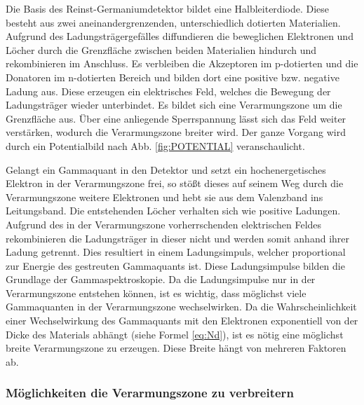 Die Basis des Reinst-Germaniumdetektor bildet eine Halbleiterdiode. Diese besteht aus zwei aneinandergrenzenden, unterschiedlich dotierten Materialien. Aufgrund des Ladungsträgergefälles diffundieren die beweglichen Elektronen und Löcher durch die Grenzfläche zwischen beiden Materialien hindurch und rekombinieren im Anschluss. Es verbleiben die Akzeptoren im p-dotierten und die Donatoren im n-dotierten Bereich und bilden dort eine positive bzw. negative Ladung aus. Diese erzeugen ein elektrisches Feld, welches die Bewegung der Ladungsträger wieder unterbindet. Es bildet sich eine Verarmungszone um die Grenzfläche aus. Über eine anliegende Sperrspannung lässt sich das Feld weiter verstärken, wodurch die Verarmungszone breiter wird.
Der ganze Vorgang wird durch ein Potentialbild nach Abb. \ref{fig:POTENTIAL} veranschaulicht.

Gelangt ein Gammaquant in den Detektor und setzt ein hochenergetisches Elektron in der Verarmungszone frei, so stößt dieses auf seinem Weg durch die Verarmungszone weitere Elektronen und hebt sie aus dem Valenzband ins Leitungsband. Die entstehenden Löcher verhalten sich wie positive Ladungen. Aufgrund des in der Verarmungszone vorherrschenden elektrischen Feldes rekombinieren die Ladungsträger in dieser nicht und werden somit anhand ihrer Ladung getrennt. Dies resultiert in einem Ladungsimpuls, welcher proportional zur Energie des gestreuten Gammaquants ist. Diese Ladungsimpulse bilden die Grundlage der Gammaspektroskopie. Da die Ladungsimpulse nur in der Verarmungszone entstehen können, ist es wichtig, dass möglichst viele Gammaquanten in der Verarmungszone wechselwirken.
Da die Wahrscheinlichkeit einer Wechselwirkung des Gammaquants mit den Elektronen exponentiell von der Dicke des Materials abhängt (siehe Formel \eqref{eq:Nd}), ist es nötig eine möglichst breite Verarmungszone zu erzeugen. Diese Breite hängt von mehreren Faktoren ab.

\subsubsection{Möglichkeiten die Verarmungszone zu verbreitern}

